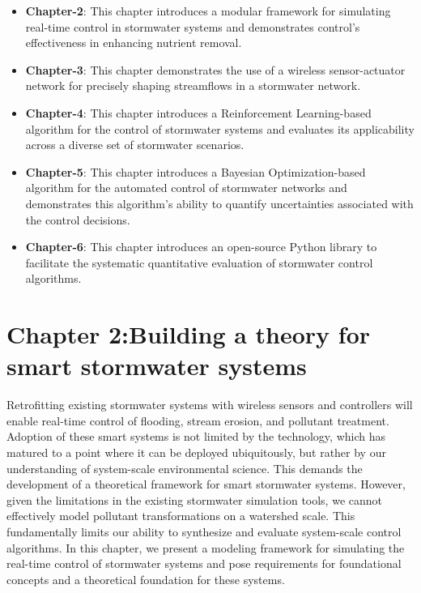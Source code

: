 \begin{itemize}
	\item \textbf{Chapter-2}: This chapter introduces a modular framework for simulating real-time control in stormwater systems and demonstrates control's effectiveness in enhancing nutrient removal.
	\item \textbf{Chapter-3}: This chapter demonstrates the use of a wireless sensor-actuator network for precisely shaping streamflows in a stormwater network.
	\item \textbf{Chapter-4}: This chapter introduces a Reinforcement Learning-based algorithm for the control of stormwater systems and evaluates its applicability across a diverse set of stormwater scenarios.
	\item \textbf{Chapter-5}: This chapter introduces a Bayesian Optimization-based algorithm for the automated control of stormwater networks and demonstrates this algorithm's ability to quantify uncertainties associated with the control decisions. 
	\item \textbf{Chapter-6}: This chapter introduces an open-source Python library to facilitate the systematic quantitative evaluation of stormwater control algorithms.
\end{itemize}
 

\section{Chapter 2:Building a theory for smart stormwater systems}

Retrofitting existing stormwater systems with wireless sensors and controllers will enable real-time control of flooding, stream erosion, and pollutant treatment. 
Adoption of these smart systems is not limited by the technology, which has matured to a point where it can be deployed ubiquitously, but rather by our understanding of system-scale environmental science.
This demands the development of a theoretical framework for smart stormwater systems.
However, given the limitations in the existing stormwater simulation tools, we cannot effectively model pollutant transformations on a watershed scale.
This fundamentally limits our ability to synthesize and evaluate system-scale control algorithms. 
In this chapter, we present a modeling framework for simulating the real-time control of stormwater systems and pose requirements for foundational concepts and a theoretical foundation for these systems. 

\

